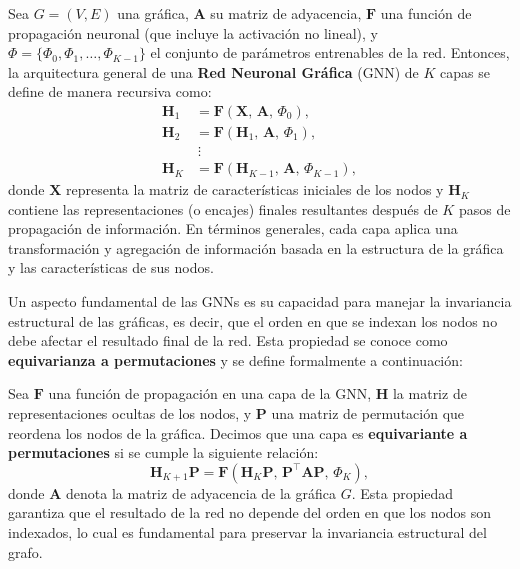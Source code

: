 \begin{definition}
    Sea $G = (V, E)$ una gráfica, $\mathbf{A}$ su matriz de adyacencia, $\mathbf{F}$ una función de propagación neuronal (que incluye la activación no lineal), y $\Phi = \{\Phi_0, \Phi_1, \dots, \Phi_{K-1}\}$ el conjunto de parámetros entrenables de la red.
    Entonces, la arquitectura general de una \textbf{Red Neuronal Gráfica} (GNN) de $K$ capas se define de manera recursiva como:
    \[
        \begin{aligned}
            \mathbf{H}_1 & = \mathbf{F}(\mathbf{X},\, \mathbf{A},\, \Phi_0),           \\
            \mathbf{H}_2 & = \mathbf{F}(\mathbf{H}_1,\, \mathbf{A},\, \Phi_1),         \\
                         & \ \vdots                                                    \\
            \mathbf{H}_K & = \mathbf{F}(\mathbf{H}_{K-1},\, \mathbf{A},\, \Phi_{K-1}),
        \end{aligned}
    \]
    donde $\mathbf{X}$ representa la matriz de características iniciales de los nodos y $\mathbf{H}_K$ contiene las representaciones (o encajes) finales resultantes después de $K$ pasos de propagación de información.
    En términos generales, cada capa aplica una transformación y agregación de información basada en la estructura de la gráfica y las características de sus nodos.
\end{definition}

Un aspecto fundamental de las GNNs es su capacidad para manejar la invariancia estructural de las gráficas, es decir, que el orden en que se indexan los nodos no debe afectar el resultado final de la red.
Esta propiedad se conoce como \textbf{equivarianza a permutaciones} y se define formalmente a continuación:

\begin{definition}[Equivarianza]
    Sea $\mathbf{F}$ una función de propagación en una capa de la GNN, $\mathbf{H}$ la matriz de representaciones ocultas de los nodos, y $\mathbf{P}$ una matriz de permutación que reordena los nodos de la gráfica.
    Decimos que una capa es \textbf{equivariante a permutaciones} si se cumple la siguiente relación:
    \[
        \mathbf{H}_{K+1}\mathbf{P} = \mathbf{F}\!\left(\mathbf{H}_K \mathbf{P},\, \mathbf{P}^\top \mathbf{A}\mathbf{P},\, \Phi_K\right),
    \]
    donde $\mathbf{A}$ denota la matriz de adyacencia de la gráfica $G$.
    Esta propiedad garantiza que el resultado de la red no depende del orden en que los nodos son indexados, lo cual es fundamental para preservar la invariancia estructural del grafo.
\end{definition}

